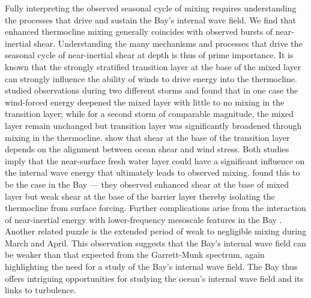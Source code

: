 \documentclass[twocol]{ametsoc}
\begin{document}
Fully interpreting the observed seasonal cycle of mixing requires understanding the processes that drive and sustain the Bay's internal wave field.
We find that enhanced thermocline mixing generally coincides with observed bursts of near-inertial shear.
Understanding the many mechanisms and processes that drive the seasonal cycle of near-inertial shear at depth is thus of prime importance.
It is known that the strongly stratified transition layer at the base of the mixed layer can strongly influence the ability of winds to drive energy into the thermocline.
\cite{Dohan2011} studied observations during two different storms and found that in one case the wind-forced energy deepened the mixed layer with little to no mixing in the transition layer; while for a second storm of comparable magnitude, the mixed layer remain unchanged but transition layer was significantly broadened through mixing in the thermocline.
\cite{Brannigan2013} show that shear at the base of the transition layer depends on the alignment between ocean shear and wind stress.
Both studies imply that the near-surface fresh water layer could have a significant influence on the internal wave energy that ultimately leads to observed mixing.
\cite{Lucas2016} found this to be the case in the Bay --- they observed enhanced shear at the base of mixed layer but weak shear at the base of the barrier layer thereby isolating the thermocline from surface forcing.
Further complications arise from the interaction of near-inertial energy with lower-frequency mesoscale features in the Bay \citep{Johnston2016}.
Another related puzzle is the extended period of weak to negligible mixing during March and April.
This observation suggests that the Bay's internal wave field can be weaker than that expected from the Garrett-Munk spectrum, again highlighting the need for a study of the Bay's internal wave field.
The Bay thus offers intriguing opportunities for studying the ocean's internal wave field and its links to turbulence.

\acknowledgments
\end{document}
